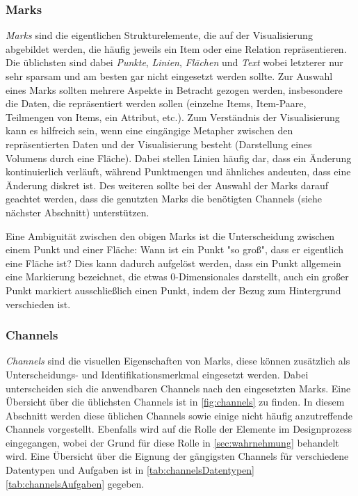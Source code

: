 			\subsubsection{Marks}
				\emph{Marks} sind die eigentlichen Strukturelemente, die auf der Visualisierung abgebildet werden, die häufig jeweils ein Item oder eine Relation repräsentieren. Die üblichsten sind dabei \emph{Punkte}, \emph{Linien}, \emph{Flächen} und \emph{Text} wobei letzterer nur sehr sparsam und am besten gar nicht eingesetzt werden sollte. Zur Auswahl eines Marks sollten mehrere Aspekte in Betracht gezogen werden, insbesondere die Daten, die repräsentiert werden sollen (einzelne Items, Item-Paare, Teilmengen von Items, ein Attribut, etc.). Zum Verständnis der Visualisierung kann es hilfreich sein, wenn eine eingängige Metapher zwischen den repräsentierten Daten und der Visualisierung besteht (\zB Darstellung eines Volumens durch eine Fläche). Dabei stellen Linien häufig dar, dass ein Änderung kontinuierlich verläuft, während Punktmengen und ähnliches andeuten, dass eine Änderung diskret ist. Des weiteren sollte bei der Auswahl der Marks darauf geachtet werden, dass die genutzten Marks die benötigten Channels (siehe nächster Abschnitt) unterstützen.

				Eine Ambiguität zwischen den obigen Marks ist die Unterscheidung zwischen einem Punkt und einer Fläche: Wann ist ein Punkt "so groß", dass er eigentlich eine Fläche ist? Dies kann dadurch aufgelöst werden, dass ein Punkt allgemein eine Markierung bezeichnet, die etwas 0-Dimensionales darstellt, \dh auch ein großer Punkt markiert ausschließlich einen Punkt, indem der Bezug zum Hintergrund verschieden ist.

			\subsubsection{Channels}
				\label{subsubsec:channels}

				\emph{Channels} sind die visuellen Eigenschaften von Marks, \dh diese können zusätzlich als Unterscheidungs- und Identifikationsmerkmal eingesetzt werden. Dabei unterscheiden sich die anwendbaren Channels nach den eingesetzten Marks. Eine Übersicht über die üblichsten Channels ist in \autoref{fig:channels} zu finden. In diesem Abschnitt werden diese üblichen Channels sowie einige nicht häufig anzutreffende Channels vorgestellt. Ebenfalls wird auf die Rolle der Elemente im Designprozess eingegangen, wobei der Grund für diese Rolle in \autoref{sec:wahrnehmung} behandelt wird. Eine Übersicht über die Eignung der gängigsten Channels für verschiedene Datentypen und Aufgaben ist in \autoref{tab:channelsDatentypen} \bzw \autoref{tab:channelsAufgaben} gegeben.

